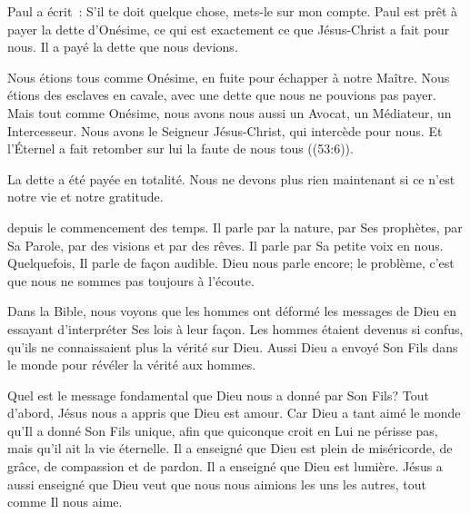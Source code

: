 
Paul a écrit~: 
 \og S'il 
 te doit quelque chose, mets-le sur mon compte. \fg{}
 Paul est prêt à payer la dette d'Onésime,
 ce qui est 
 exactement ce que Jésus-Christ a fait pour nous.
 Il a payé la dette que nous devions. 

Nous étions tous comme Onésime, en fuite pour échapper à notre Maître.
 Nous étions des esclaves en cavale, avec une dette que nous ne pouvions
 pas payer.
 Mais tout comme Onésime, nous avons nous aussi un Avocat, un Médiateur,
 un Intercesseur. Nous avons le Seigneur Jésus-Christ,
 qui intercède pour nous.
 \og Et l'Éternel a fait retomber sur lui la faute de nous tous \fg{}
 ((53:6)). 

La dette a été payée en totalité.
 Nous ne devons plus rien maintenant
 \ocadr si ce n'est notre vie et notre gratitude.

\dvrule






 depuis le commencement des temps.
 Il parle par la nature, par Ses prophètes, par Sa Parole, par des visions
 et par des rêves.
 Il parle par Sa petite voix en nous. Quelquefois, Il parle de façon audible.
 Dieu nous parle encore; le problème, c'est que nous ne sommes pas toujours
 à l'écoute. 

Dans la Bible, nous voyons que les hommes ont déformé les messages de Dieu
 en essayant d'interpréter Ses lois à leur façon.
 Les hommes étaient devenus si confus, qu'ils ne connaissaient plus
 la vérité sur Dieu.
 Aussi Dieu a envoyé Son Fils dans le monde
 pour révéler la vérité aux hommes. 


Quel est le message fondamental que Dieu nous a donné par Son Fils?
 Tout d'abord, Jésus nous a appris que Dieu est amour.
 \og Car Dieu a tant aimé le monde qu'Il a donné Son Fils unique,
 afin que quiconque croit en Lui ne périsse pas, mais qu'il ait
 la vie éternelle. \fg{}
 Il a enseigné que Dieu est plein de miséricorde, de grâce,
 de compassion et de pardon. Il a enseigné que Dieu est lumière.
 Jésus a aussi enseigné que Dieu veut que nous nous aimions
 les uns les autres, tout comme Il nous aime. 

